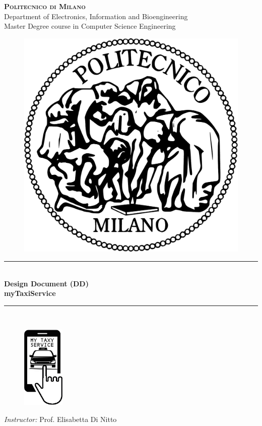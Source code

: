 \documentclass[12pt]{report}
\begin{document}

\begin{titlepage}

\newcommand{\HRule}{\rule{\linewidth}{0.5mm}} %

\center %

\textsc{\huge \bf{Politecnico di Milano}}\\[0.5cm]
\textsf{\Large Department of Electronics, Information and Bioengineering}\\[0.25cm] %
\textsf{\large Master Degree course in Computer Science Engineering}\\[0.5cm] %

\begin{figure}[h]
	\center \includegraphics[width = 3 cm]{Figures/PoliMi}
\end{figure}


\HRule \\
{\Huge \bfseries {Design Document (DD)} \\[0.2cm] \Large {myTaxiService}}\\ %
\HRule \\[1cm]

\begin{figure}[h]
	\center \includegraphics[width=2cm]{Figures/logo3}
\end{figure}


\begin{flushleft}
	\large \textit{Instructor:} Prof. Elisabetta Di Nitto \\[0.5cm]


\end{flushleft}
\end{titlepage}
\end{document}
